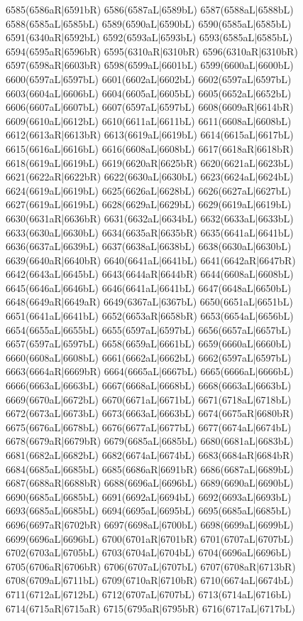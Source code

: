 6585(6586aR|6591bR) 6586(6587aL|6589bL) 6587(6588aL|6588bL) \\6588(6585aL|6585bL) 6589(6590aL|6590bL) 6590(6585aL|6585bL) 6591(6340aR|6592bL) 6592(6593aL|6593bL) 6593(6585aL|6585bL) 6594(6595aR|6596bR) 6595(6310aR|6310bR) 6596(6310aR|6310bR) \\6597(6598aR|6603bR) 6598(6599aL|6601bL) 6599(6600aL|6600bL) 6600(6597aL|6597bL) 6601(6602aL|6602bL) 6602(6597aL|6597bL) 6603(6604aL|6606bL) 6604(6605aL|6605bL) 6605(6652aL|6652bL) \\6606(6607aL|6607bL) 6607(6597aL|6597bL) 6608(6609aR|6614bR) 6609(6610aL|6612bL) 6610(6611aL|6611bL) 6611(6608aL|6608bL) 6612(6613aR|6613bR) 6613(6619aL|6619bL) 6614(6615aL|6617bL) \\6615(6616aL|6616bL) 6616(6608aL|6608bL) 6617(6618aR|6618bR) 6618(6619aL|6619bL) 6619(6620aR|6625bR) 6620(6621aL|6623bL) 6621(6622aR|6622bR) 6622(6630aL|6630bL) 6623(6624aL|6624bL) \\6624(6619aL|6619bL) 6625(6626aL|6628bL) 6626(6627aL|6627bL) 6627(6619aL|6619bL) 6628(6629aL|6629bL) 6629(6619aL|6619bL) 6630(6631aR|6636bR) 6631(6632aL|6634bL) 6632(6633aL|6633bL) \\6633(6630aL|6630bL) 6634(6635aR|6635bR) 6635(6641aL|6641bL) 6636(6637aL|6639bL) 6637(6638aL|6638bL) 6638(6630aL|6630bL) 6639(6640aR|6640bR) 6640(6641aL|6641bL) 6641(6642aR|6647bR) \\6642(6643aL|6645bL) 6643(6644aR|6644bR) 6644(6608aL|6608bL) 6645(6646aL|6646bL) 6646(6641aL|6641bL) 6647(6648aL|6650bL) 6648(6649aR|6649aR) 6649(6367aL|6367bL) 6650(6651aL|6651bL) \\6651(6641aL|6641bL) 6652(6653aR|6658bR) 6653(6654aL|6656bL) 6654(6655aL|6655bL) 6655(6597aL|6597bL) 6656(6657aL|6657bL) 6657(6597aL|6597bL) 6658(6659aL|6661bL) 6659(6660aL|6660bL) \\6660(6608aL|6608bL) 6661(6662aL|6662bL) 6662(6597aL|6597bL) 6663(6664aR|6669bR) 6664(6665aL|6667bL) 6665(6666aL|6666bL) 6666(6663aL|6663bL) 6667(6668aL|6668bL) 6668(6663aL|6663bL) \\6669(6670aL|6672bL) 6670(6671aL|6671bL) 6671(6718aL|6718bL) 6672(6673aL|6673bL) 6673(6663aL|6663bL) 6674(6675aR|6680bR) 6675(6676aL|6678bL) 6676(6677aL|6677bL) 6677(6674aL|6674bL) \\6678(6679aR|6679bR) 6679(6685aL|6685bL) 6680(6681aL|6683bL) 6681(6682aL|6682bL) 6682(6674aL|6674bL) 6683(6684aR|6684bR) 6684(6685aL|6685bL) 6685(6686aR|6691bR) 6686(6687aL|6689bL) \\6687(6688aR|6688bR) 6688(6696aL|6696bL) 6689(6690aL|6690bL) 6690(6685aL|6685bL) 6691(6692aL|6694bL) 6692(6693aL|6693bL) 6693(6685aL|6685bL) 6694(6695aL|6695bL) 6695(6685aL|6685bL) \\6696(6697aR|6702bR) 6697(6698aL|6700bL) 6698(6699aL|6699bL) 6699(6696aL|6696bL) 6700(6701aR|6701bR) 6701(6707aL|6707bL) 6702(6703aL|6705bL) 6703(6704aL|6704bL) 6704(6696aL|6696bL) \\6705(6706aR|6706bR) 6706(6707aL|6707bL) 6707(6708aR|6713bR) 6708(6709aL|6711bL) 6709(6710aR|6710bR) 6710(6674aL|6674bL) 6711(6712aL|6712bL) 6712(6707aL|6707bL) 6713(6714aL|6716bL) \\6714(6715aR|6715aR) 6715(6795aR|6795bR) 6716(6717aL|6717bL) 
